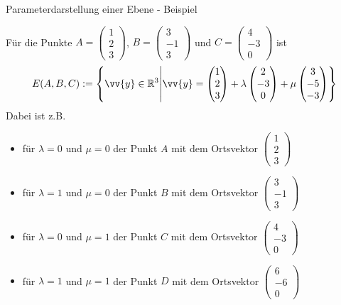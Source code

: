 \begin{frame}{Parameterdarstellung einer Ebene - Beispiel}
	
	{\footnotesize Für die Punkte $A=\begin{pmatrix}1\\2\\3\end{pmatrix}$, $B=\begin{pmatrix}3\\-1\\3\end{pmatrix}$ und $C=\begin{pmatrix}4\\-3\\0\end{pmatrix}$ ist
	\[
	E(A,B,C):= \left\{ \vv{y} \in \mathbb{R}^3 \middle| \vv{y} = \begin{pmatrix}
	1\\2\\3
	\end{pmatrix} + \lambda \begin{pmatrix}
	2\\-3\\0
	\end{pmatrix} + \mu \begin{pmatrix}
	3\\-5\\-3
	\end{pmatrix} \right\}
	\]
	Dabei ist z.B.
	\begin{itemize}
	\item für $\lambda = 0$ und $\mu = 0$ der Punkt $A$ mit dem Ortsvektor $\begin{pmatrix}1\\2\\3\end{pmatrix}$
	\item für $\lambda = 1$ und $\mu = 0$ der Punkt $B$ mit dem Ortsvektor $\begin{pmatrix}3\\-1\\3\end{pmatrix}$
	\item für $\lambda = 0$ und $\mu = 1$ der Punkt $C$ mit dem Ortsvektor $\begin{pmatrix}4\\-3\\0\end{pmatrix}$
	\item für $\lambda = 1$ und $\mu = 1$ der Punkt $D$ mit dem Ortsvektor $\begin{pmatrix}6\\-6\\0\end{pmatrix}$
	\end{itemize}}
\end{frame}

